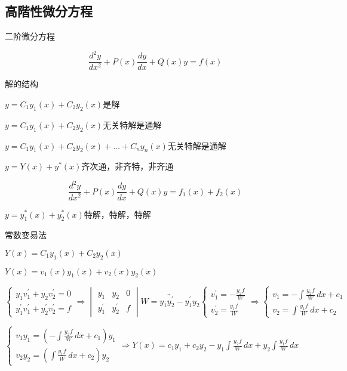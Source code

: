 \documentclass[UTF8]{ctexart}
\begin{document}
\subsection{高階性微分方程}
二阶微分方程\par
$$\frac{d^2y}{dx^2}+P\left(x\right)\frac{dy}{dx}+Q\left(x\right)y=f\left(x\right)$$\par
解的结构\par
$y=C_1y_1\left(x\right)+C_2y_2\left(x\right)$是解\par
$y=C_1y_1\left(x\right)+C_2y_2\left(x\right)$无关特解是通解\par
$y=C_1y_1\left(x\right)+C_2y_2\left(x\right)+\dots + C_ny_n\left(x\right) $无关特解是通解\par
$y=Y\left(x\right)+y^*\left(x\right)$齐次通，非齐特，非齐通\par
$$\frac{d^2y}{dx^2}+P\left(x\right)\frac{dy}{dx}+Q\left(x\right)y=f_1\left(x\right)+f_2\left(x\right)$$\par
$y=y_1^*\left(x\right)+y_2^*\left(x\right)$特解，特解，特解\par
常数变易法\par
$Y\left(x\right)=C_1y_1\left(x\right)+C_2y_2\left(x\right)$\par
$Y\left(x\right)=v_1\left(x\right)y_1\left(x\right)+v_2\left(x\right)y_2\left(x\right)$\par
$
\left\{
    \begin{array}{ll}
        y_1v_1^{'}+y_2v_2^{'}=0\\
        y_1^{'}v_1^{'}+y_2^{'}v_2^{'}=f
    \end{array}
\right.\Rightarrow 
\begin{vmatrix}
    y_1 & y_2 &0\\
    y_1^{'} & y_2^{'} &f
\end{vmatrix}
\underrightarrow{W=y_1y_2^{'}-y_1^{'}y_2}
\left\{ 
\begin{array}{ll}
    v_1^{'}=-\frac{y_2f}{W}\\
    v_2^{'}=\frac{y_1f}{W}  
\end{array}
\right.\Rightarrow
\left\{ 
\begin{array}{ll}
    v_1=-\int \frac{y_2f}{W}\,dx+c_1\\
    v_2=\int \frac{y_1f}{W}\,dx+c_2  
\end{array}
\right.
$\par

$\left\{ 
    \begin{array}{ll}
        v_1y_1=\left(-\int \frac{y_2f}{W}\,dx+c_1\right)y_1\\
        v_2y_2=\left( \int \frac{y_1f}{W}\,dx+c_2 \right)y_2  
    \end{array}\Rightarrow
    Y\left(x\right)=c_1y_1+c_2y_2-y_1\int \frac{y_2f}{W}\,dx
    +y_2\int \frac{y_1f}{W}\,dx
\right.$
\end{document}
